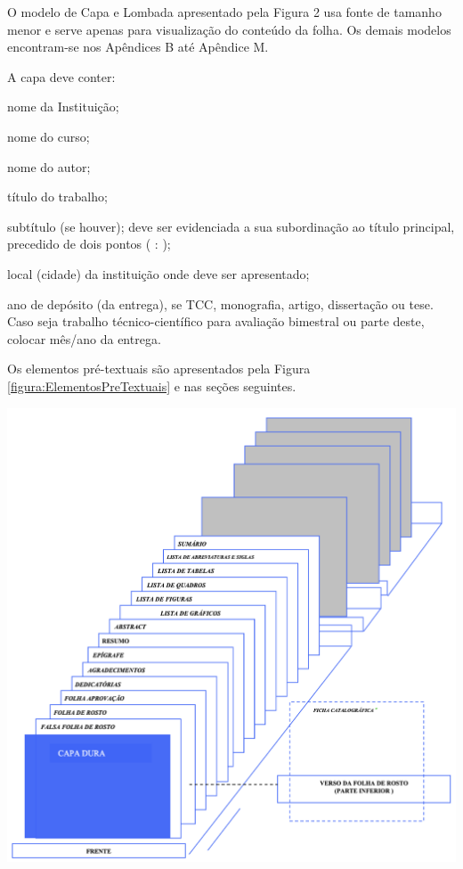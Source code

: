 \begin{Desenvolvimento}
O modelo de Capa e Lombada apresentado pela Figura 2 usa fonte de tamanho menor e serve apenas para visualização do conteúdo da folha. Os demais modelos encontram-se nos Apêndices B até Apêndice M.

A capa deve conter:
\begin{alinea}
  \item nome da Instituição;
  \item nome do curso;
  \item nome do autor;
  \item título do trabalho;
  \item subtítulo (se houver); deve ser evidenciada a sua subordinação ao título principal, precedido de dois pontos ( : );
  \item local (cidade) da instituição onde deve ser apresentado;
  \item ano de depósito (da entrega), se TCC, monografia, artigo, dissertação ou tese. Caso seja trabalho técnico-científico para avaliação bimestral ou parte deste, colocar mês/ano da entrega.
\end{alinea}

Os elementos pré-textuais são apresentados pela Figura \ref{figura:ElementosPreTextuais} e nas seções seguintes.

\begin{figura}[h!]
  \centering
  \addfigura
  \includegraphics[width=1\textwidth]{ilustracoes/figuras/Elementos Pre Textuais.png}
  \label{figura:ElementosPreTextuais}
\end{figura}


\end{Desenvolvimento}
